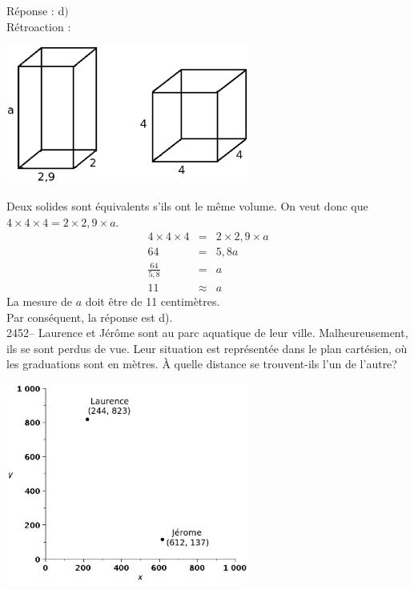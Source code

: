 \documentclass[letterpaper, 12pt]{article}
\begin{document}
R\'eponse : d$)$\\

R\'etroaction :\\
\begin{center}
 \includegraphics[width=8cm,bb=0 536 571 842]{Q2451.eps}
\end{center}
Deux solides sont \'equivalents s'ils ont le m\^eme volume. On veut donc que $4\times 4\times4 = 2 \times 2,9 \times a$.
\begin{eqnarray*}
4\times 4\times4  &=& 2 \times 2,9 \times a\\
64  &=& 5,8a\\[2mm]
\frac{64}{5,8}  &=& a\\[2mm]
11  &\approx& a
\end{eqnarray*}
La mesure de $a$ doit \^etre de 11 centim\`etres.\\
Par cons\'equent, la r\'eponse est d).\\


2452-- Laurence et J\'er\^ome sont au parc aquatique de leur ville. Malheureusement, ils se sont perdus de vue. Leur situation est repr\'esent\'ee dans le plan cart\'esien, o\`u les graduations sont en m\`etres. \`A quelle distance se trouvent-ils l'un de l'autre?\\
\begin{center}
 \includegraphics[width=8cm,bb=0 375 566 842]{Q2452.eps}
\end{center}
\end{document}
